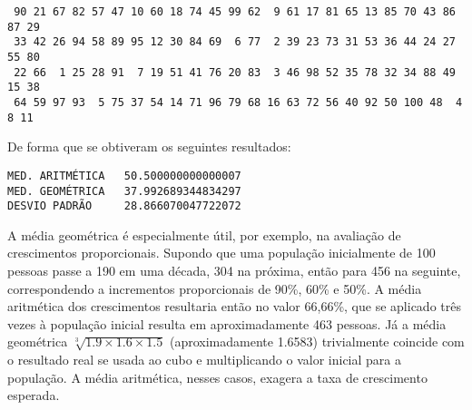 \documentclass{article}
\begin{document}
\begin{lstlisting}
 90 21 67 82 57 47 10 60 18 74 45 99 62  9 61 17 81 65 13 85 70 43 86 87 29
 33 42 26 94 58 89 95 12 30 84 69  6 77  2 39 23 73 31 53 36 44 24 27 55 80
 22 66  1 25 28 91  7 19 51 41 76 20 83  3 46 98 52 35 78 32 34 88 49 15 38
 64 59 97 93  5 75 37 54 14 71 96 79 68 16 63 72 56 40 92 50 100 48  4  8 11
\end{lstlisting}

De forma que se obtiveram os seguintes resultados:

\begin{lstlisting}
MED. ARITMÉTICA   50.500000000000007     
MED. GEOMÉTRICA   37.992689344834297     
DESVIO PADRÃO     28.866070047722072     
\end{lstlisting}

A média geométrica é especialmente útil, por exemplo, na avaliação de crescimentos proporcionais. Supondo que uma população inicialmente  de 100 pessoas passe a 190 em uma década, 304 na próxima, então para 456 na seguinte, correspondendo a incrementos proporcionais de 90\%, 60\% e 50\%. A média aritmética dos crescimentos resultaria então no valor 66,66\%, que se aplicado três vezes à população inicial resulta em aproximadamente 463 pessoas. Já a média geométrica $\sqrt[3]{1.9 \times 1.6 \times 1.5}$ (aproximadamente 1.6583) trivialmente coincide com o resultado real se usada ao cubo e multiplicando o valor inicial para a população. A média aritmética, nesses casos, exagera a taxa de crescimento esperada.
\end{document}
